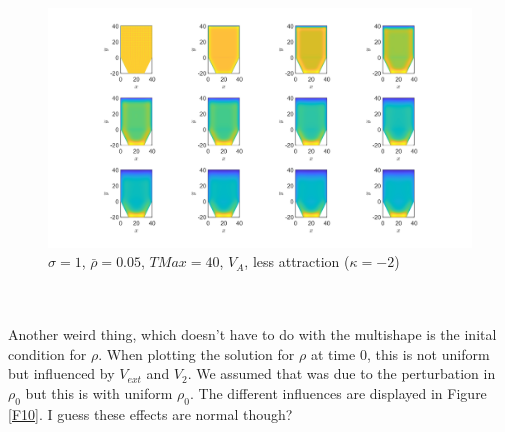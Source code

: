 \documentclass[11pt, a4paper]{article}
\theoremstyle{definition}
\begin{document}
\begin{figure}[h]
	\centering
	\includegraphics[scale=0.25]{PrettyPicture2.png}
	\caption{$\sigma =1$, $\bar \rho =0.05$, $TMax = 40$, $V_A$, less attraction ($\kappa = -2$)} 
	\label{Fpp2}
\end{figure}
\\
\\
Another weird thing, which doesn't have to do with the multishape is the inital condition for $\rho$. When plotting the solution for $\rho$ at time $0$, this is not uniform but influenced by $V_{ext}$ and $V_2$. We assumed that was due to the perturbation in $\rho_0$ but this is with uniform $\rho_0$. The different influences are displayed in Figure \ref{F10}. I guess these effects are normal though? 
\end{document}
